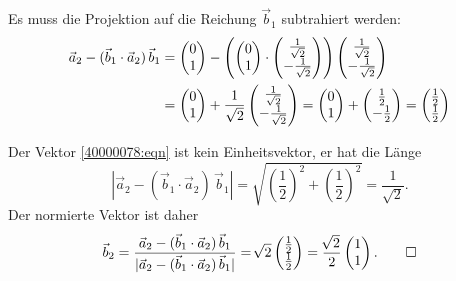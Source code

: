 \begin{loesung}
\begin{teilaufgaben}
\item Es muss die Projektion auf die Reichung $\vec{b}_1$ subtrahiert werden:
\begin{align}
\vec{a}_2-(\vec{b}_1\cdot\vec{a}_2)\,\vec{b}_1
&=
\begin{pmatrix}
0\\
1
\end{pmatrix}
-
\left(
\begin{pmatrix}
0\\
1
\end{pmatrix}
\cdot
\begin{pmatrix}
 \frac{1}{\sqrt{2}}\\
-\frac{1}{\sqrt{2}}\\
\end{pmatrix}
\right)
\begin{pmatrix}
 \frac{1}{\sqrt{2}}\\
-\frac{1}{\sqrt{2}}\\
\end{pmatrix}
\notag
\\
&=
\begin{pmatrix}
0\\
1
\end{pmatrix}
+
\frac{1}{\sqrt{2}}
\begin{pmatrix}
 \frac{1}{\sqrt{2}}\\
-\frac{1}{\sqrt{2}}\\
\end{pmatrix}
=
\begin{pmatrix}
0\\
1
\end{pmatrix}
+
\begin{pmatrix}
 \frac12\\
-\frac12
\end{pmatrix}
=
\begin{pmatrix}
\frac12\\
\frac12
\end{pmatrix}
\label{40000078:eqn}
\end{align}
\item
Der Vektor \eqref{40000078:eqn} ist kein Einheitsvektor, er hat die 
Länge
\[
|\vec{a}_2-(\vec{b}_1\cdot\vec{a}_2)\,\vec{b}_1|
=
\sqrt{(\textstyle\frac12)^2+(\textstyle\frac12)^2}
=
\frac{1}{\!\sqrt{2}}.
\]
Der normierte Vektor ist daher
\[
\vec{b}_2
=
\frac{
\vec{a}_2-(\vec{b}_1\cdot\vec{a}_2)\,\vec{b}_1
}{
|\vec{a}_2-(\vec{b}_1\cdot\vec{a}_2)\,\vec{b}_1|
}
=
\!\sqrt{2}
\begin{pmatrix}
\frac12\\
\frac12
\end{pmatrix}
=
\frac{\!\sqrt{2}}2
\begin{pmatrix}1\\1\end{pmatrix}.
\qedhere
\]
\end{teilaufgaben}
\end{loesung}
